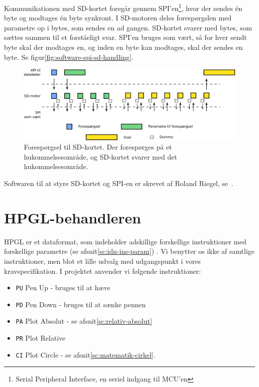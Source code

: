 Kommunikationen med SD-kortet foregår gennem SPI'en\footnote{Serial
  Peripheral Interface, en seriel indgang til MCU'en}, hvor der sendes
én byte og modtages én byte synkront. I SD-motoren deles forespørgslen
med parametre op i bytes, som sendes en ad gangen. SD-kortet svarer
med bytes, som sættes sammen til et forståeligt svar. SPI'en bruges
som vært, så for hver sendt byte skal der modtages en, og inden en
byte kan modtages, skal der sendes en byte. Se
figur\vref{fig:software-spi-sd-handling}.

\begin{figure}[htbp]
  \centering
  \includegraphics[width=\textwidth]{../brugere/kjaergaard/datafeeder-handling}
  \caption{Forespørgsel til SD-kortet. Der forespørges på et
    hukommelsesområde, og SD-kortet svarer med det hukommelsesområde.}
  \label{fig:software-spi-sd-handling}
\end{figure}


Softwaren til at styre SD-kortet og SPI-en er skrevet af Roland
Riegel, se~\cite{bbt:sd-software}.


\section{HPGL-behandleren}


HPGL er et dataformat, som indeholder adskillige forskellige
instruktioner med forskellige parametre (se
afsnit\vref{sc:idn-ins-param}) . Vi benytter os ikke af samtlige
instruktioner, men blot et lille udvalg med udgangspunkt i vores
kravspecifikation. I projektet anvender vi følgende instruktioner:

\begin{itemize} \firmlist
\item \texttt{PU} Pen Up - bruges til at hæve
\item \texttt{PD} Pen Down - bruges til at sænke pennen
\item \texttt{PA} Plot Absolut - se afsnit\vref{sc:relativ-absolut}
\item \texttt{PR} Plot Relative
\item \texttt{CI}  Plot Circle - se afsnit\vref{sc:matematik-cirkel}.
\end{itemize}


